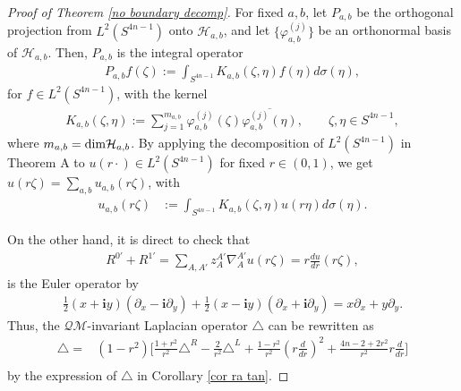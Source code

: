 \documentclass[a4paper,11pt]{amsart}
\numberwithin{equation}{section}
\begin{document}
\begin{proof}[Proof of Theorem \ref{no boundary decomp}]
For fixed $a,b$, let $P_{a,b}$ be the orthogonal projection from $L^2(S^{4n-1})$ onto $\mathcal{H}_{a,b}$, and let $\{\varphi_{a,b}^{(j)}\}$ be an orthonormal basis of $\mathcal{H}_{a,b}$. Then, $P_{a,b}$ is the integral operator
\begin{equation}\begin{aligned}\label{decom pab}
P_{a,b}f(\zeta):=\int_{S^{4n-1}}K_{a,b}(\zeta,\eta)f(\eta)d\sigma(\eta),
\end{aligned}\end{equation}
for $f\in L^2(S^{4n-1})$, with the kernel
\begin{equation*}\begin{aligned}
K_{a,b}(\zeta,\eta):=\sum_{j=1}^{m_{a,b}}\varphi_{a,b}^{(j)}(\zeta)\overline{\varphi_{a,b}^{(j)}(\eta)},\qquad \zeta,\eta\in S^{4n-1},
\end{aligned}\end{equation*}
where $m_{a,b}={\rm dim} \mathcal{H}_{a,b}$.
By applying the decomposition of $L^2(S^{4n-1})$ in Theorem A to $u(r\cdot)\in L^2(S^{4n-1})$ for fixed $r\in(0,1)$, we get $u(r\zeta)=\sum_{a,b}u_{a,b}(r\zeta)$, with
\begin{equation}\begin{aligned}\label{f lambda}
u_{a,b}(r\zeta)&:=\int_{S^{4n-1}}K_{a,b}(\zeta,\eta)u(r\eta)d\sigma(\eta).
\end{aligned}\end{equation}

    On the other hand, it is direct to check that
\begin{equation}\begin{aligned}
R^{0'}+R^{1'}=\sum_{A,A'}z_A^{A'}\nabla_A^{A'}u(r\zeta)=r\frac{du}{dr}(r\zeta),
\end{aligned}\end{equation}
is the Euler operator by
\begin{equation*}\begin{aligned}
\frac12(x+\mathbf{i}y)(\partial_x-\mathbf{i}\partial_y)+\frac12(x-\mathbf{i}y)(\partial_x+\mathbf{i}\partial_y)=x\partial_x+y\partial_y.
\end{aligned}\end{equation*}
Thus, the $\mathcal{QM}$-invariant Laplacian operator $\triangle$ can be rewritten as
\begin{equation}\begin{aligned}\label{radial decomp}
\triangle=&(1-r^2)\bigg[\frac{1+r^2}{r^2}\triangle^R-\frac{2}{r^2}\triangle^L+\frac{1-r^2}{r^2}\left(r\frac{d}{dr} \right)^2 +\frac{4n-2+2r^2}{r^2} r\frac{d}{dr}\bigg]\\
\end{aligned}\end{equation}
by the expression of $\triangle$ in Corollary \ref{cor ra tan}.


\end{proof}
\end{document}
